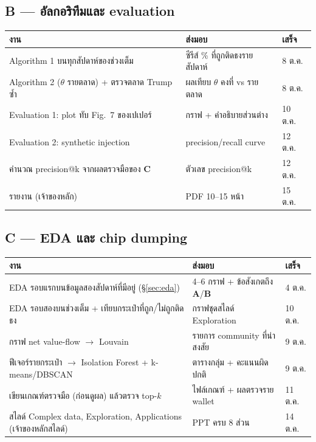 \documentclass[11pt,a4paper]{article}
\newcommand{\sansall}{\sffamily}
\newcommand{\en}[1]{#1}
\newcommand{\stg}[2]{\textcolor{#1}{\textbf{\en{#2}}}}
\newcommand{\rA}{\stg{accent}{A}}
\newcommand{\rB}{\stg{alg}{B}}
\newcommand{\rC}{\stg{ext}{C}}
\newcommand{\thd}[1]{\sansall\bfseries #1}
\begin{document}
\subsection{\rB{} --- อัลกอริทึมและ evaluation }

\begin{table}[H]
\centering\small
\begin{tabular}{L{8.2cm}L{4.2cm}L{1.8cm}}
\toprule
\thd{งาน} & \thd{ส่งมอบ} & \thd{เสร็จ} \\
\midrule
Algorithm 1 บนทุกสัปดาห์ของช่วงเต็ม & ซีรีส์ \% ที่ถูกติดธงรายสัปดาห์ & 8 ต.ค. \\
\addlinespace
Algorithm 2 ($\theta$ รายตลาด) + ตรวจตลาด Trump ซ้ำ & ผลเทียบ $\theta$ คงที่ vs รายตลาด & 8 ต.ค. \\
\addlinespace
Evaluation 1: plot ทับ Fig.~7 ของเปเปอร์ & กราฟ + คำอธิบายส่วนต่าง & 10 ต.ค. \\
\addlinespace
Evaluation 2: synthetic injection & precision/recall curve & 12 ต.ค. \\
\addlinespace
คำนวณ precision@k จากผลตรวจมือของ \rC & ตัวเลข precision@k & 12 ต.ค. \\
\addlinespace
รายงาน (เจ้าของหลัก) & PDF 10--15 หน้า & 15 ต.ค. \\
\bottomrule
\end{tabular}
\end{table}

\subsection{\rC{} --- EDA และ chip dumping }

\begin{table}[H]
\centering\small
\begin{tabular}{L{8.2cm}L{4.2cm}L{1.8cm}}
\toprule
\thd{งาน} & \thd{ส่งมอบ} & \thd{เสร็จ} \\
\midrule
EDA รอบแรกบนข้อมูลสองสัปดาห์ที่มีอยู่ (§\ref{sec:eda}) & 4--6 กราฟ + ข้อสังเกตถึง \rA/\rB & 4 ต.ค. \\
\addlinespace
EDA รอบสองบนช่วงเต็ม + เทียบกระเป๋าที่ถูก/ไม่ถูกติดธง & กราฟชุดสไลด์ Exploration & 10 ต.ค. \\
\addlinespace
กราฟ net value-flow \ensuremath{\to} Louvain & รายการ community ที่น่าสงสัย & 9 ต.ค. \\
\addlinespace
ฟีเจอร์รายกระเป๋า \ensuremath{\to} Isolation Forest + k-means/DBSCAN & ตารางกลุ่ม + คะแนนผิดปกติ & 9 ต.ค. \\
\addlinespace
เขียนเกณฑ์ตรวจมือ (ก่อนดูผล) แล้วตรวจ top-$k$ & ไฟล์เกณฑ์ + ผลตรวจราย wallet & 11 ต.ค. \\
\addlinespace
สไลด์ Complex data, Exploration, Applications (เจ้าของหลักสไลด์) & PPT ครบ 8 ส่วน & 14 ต.ค. \\
\bottomrule
\end{tabular}
\end{table}
\end{document}
